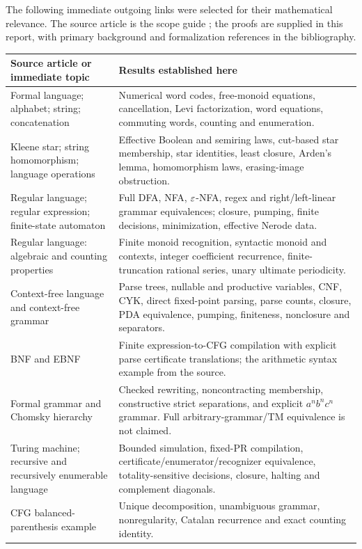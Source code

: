 The following immediate outgoing links were selected for their mathematical
relevance. The source article is the scope guide \cite{Target}; the proofs
are supplied in this report, with primary background and formalization
references in the bibliography.

\begin{longtable}{@{}p{}p{}@{}}
\toprule
Source article or immediate topic & Results established here\\
\midrule\endhead
Formal language; alphabet; string; concatenation & Numerical word codes,
free-monoid equations, cancellation, Levi factorization, word equations,
commuting words, counting and enumeration.\\
Kleene star; string homomorphism; language operations & Effective Boolean
and semiring laws, cut-based star membership, star identities, least
closure, Arden's lemma, homomorphism laws, erasing-image obstruction.\\
Regular language; regular expression; finite-state automaton & Full DFA,
NFA, $\varepsilon$-NFA, regex and right/left-linear grammar equivalences;
closure, pumping, finite decisions, minimization, effective Nerode data.\\
Regular language: algebraic and counting properties & Finite monoid
recognition, syntactic monoid and contexts, integer coefficient recurrence,
finite-truncation rational series, unary ultimate periodicity.\\
Context-free language and context-free grammar & Parse trees, nullable and
productive variables, CNF, CYK, direct fixed-point parsing, parse counts,
closure, PDA equivalence, pumping, finiteness, nonclosure and separators.\\
BNF and EBNF & Finite expression-to-CFG compilation with explicit parse
certificate translations; the arithmetic syntax example from the source.\\
Formal grammar and Chomsky hierarchy & Checked rewriting, noncontracting
membership, constructive strict separations, and explicit $a^nb^nc^n$
grammar. Full arbitrary-grammar/TM equivalence is not claimed.\\
Turing machine; recursive and recursively enumerable language & Bounded
simulation, fixed-PR compilation, certificate/enumerator/recognizer
equivalence, totality-sensitive decisions, closure, halting and complement
diagonals.\\
CFG balanced-parenthesis example & Unique decomposition, unambiguous
grammar, nonregularity, Catalan recurrence and exact counting identity.\\
\bottomrule
\end{longtable}

